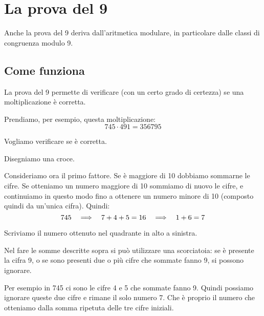 \chapter{La prova del 9}
\label{ch:prova_del_9}

Anche la prova del 9 deriva dall'aritmetica modulare, in particolare dalle classi di congruenza modulo 9.

\section{Come funziona}
\label{sec:prova_del_9_come}

La prova del 9 permette di verificare (con un certo grado di certezza) se una moltiplicazione è corretta.

Prendiamo, per esempio, questa moltiplicazione:
\begin{equation*}
    745 \cdot 491 = 356795
\end{equation*}

Vogliamo verificare se è corretta.

Disegniamo una croce.
\begin{center}
\end{center}

Consideriamo ora il primo fattore.
Se è maggiore di 10 dobbiamo sommarne le cifre.
Se otteniamo un numero maggiore di 10 sommiamo di nuovo le cifre, e continuiamo in questo modo fino a ottenere un numero
minore di 10 (composto quindi da un'unica cifra).
Quindi:
\begin{equation*}
	745  \quad\Longrightarrow\quad  7+4+5=16  \quad\Longrightarrow\quad  1+6=7
\end{equation*}

Scriviamo il numero ottenuto nel quadrante in alto a sinistra.
\begin{center}
\end{center}

Nel fare le somme descritte sopra si può utilizzare una scorciatoia: se è presente la cifra 9, o se sono presenti due o
più cifre che sommate fanno 9, si possono ignorare.

Per esempio in 745 ci sono le cifre 4 e 5 che sommate fanno 9.
Quindi possiamo ignorare queste due cifre e rimane il solo numero 7.
Che è proprio il numero che otteniamo dalla somma ripetuta delle tre cifre iniziali.

